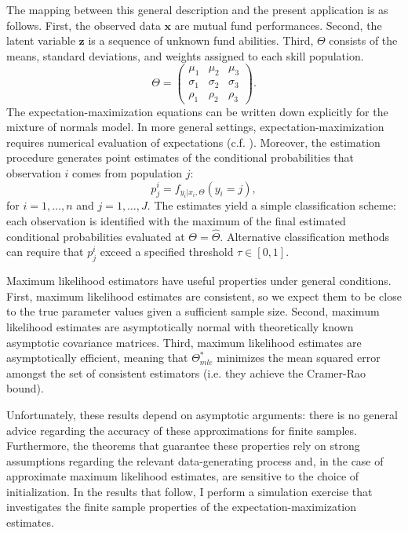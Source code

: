 The mapping between this general description and the present application is as follows.  First, the observed data $\mathbf{x}$ are mutual fund performances.  Second, the latent variable $\mathbf{z}$ is a sequence of unknown fund abilities.  Third, $\Theta$ consists of the means, standard deviations, and weights assigned to each skill population.
%
\begin{equation} \label{eqn:mixture}
\Theta = \begin{pmatrix} \mu_1 & \mu_2 & \mu_3 \\ \sigma_1 & \sigma_2 & \sigma_3 \\ \rho_1 & \rho_2 & \rho_3 \end{pmatrix}.
\end{equation}
%
The expectation-maximization equations can be written down explicitly for the mixture of normals model. In more general settings, expectation-maximization requires numerical evaluation of expectations (c.f. \citet{Casella2010}). Moreover, the estimation procedure generates point estimates of the conditional probabilities that observation $i$ comes from population $j$:
%
\begin{equation}
\label{eq:posterior}
p_j^i = f_{ y_i | x_i, \Theta}(y_i = j),
\end{equation}
%
for $ i = 1, \dots, n$ and $ j = 1, \dots, J$. The estimates yield a simple classification scheme: each observation is identified with the maximum of the final estimated conditional probabilities evaluated at $\Theta = \hat{\Theta}$.  Alternative classification methods can require that $p_j^i$ exceed a specified threshold $\tau \in [0, 1]$.

Maximum likelihood estimators have useful properties under general conditions. First, maximum likelihood estimates are consistent, so we expect them to be close to the true parameter values given a sufficient sample size. Second, maximum likelihood estimates are asymptotically normal with theoretically known asymptotic covariance matrices. Third, maximum likelihood estimates are asymptotically efficient, meaning that $\Theta_{mle}^*$ minimizes the mean squared error amongst the set of consistent estimators (i.e. they achieve the Cramer-Rao bound).

Unfortunately, these results depend on asymptotic arguments: there is no general advice regarding the accuracy of these approximations for finite samples. Furthermore, the theorems that guarantee these properties rely on strong assumptions regarding the relevant data-generating process and, in the case of approximate maximum likelihood estimates, are sensitive to the choice of initialization.  In the results that follow, I perform a simulation exercise that investigates the finite sample properties of the expectation-maximization estimates.

